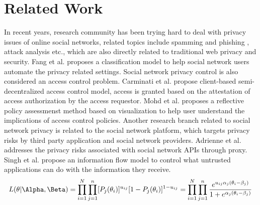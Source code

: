 \documentclass[a4paper]{article}
\begin{document}

\section{Related Work}

In recent years, research community has been trying hard to deal with
privacy issues of online social networks, related topics include
spamming and phishing \cite{twitter-spam, SN-explore-spam,
SN-automated-cheap-spam, social-spam-detection, video-spam-youtube},
attack analysis \cite{neighborhood-attack, 1658958,
group-deanonymization-attack, anony-link-attack,
identity-theft-attack, sybil-attack, 1608132} etc., which are also
directly related to traditional web privacy and security. Fang et
al. \cite{privacy-wizard} proposes a classification model to help
social network users automate the privacy related settings. Social
network privacy control is also considered an access control
problem. Carminati et al. \cite{crypto-collaborative-ac,
rule-based-ac} propose client-based semi-decentralized access control
model, access is granted based on the attestation of access
authorization by the access requestor. Mohd et
al. \cite{Anwar_visualizingprivacy} proposes a reflective policy
assessmenst method based on visualization to help user understand the
implications of access control policies. Another research branch
related to social network privacy is related to the social network
platform, which targets privacy risks by third party application and
social network providers. Adrienne et
al. \cite{Felt08privacyprotection} addresses the privacy risks
associated with social network APIs through proxy. Singh et
al. \cite{xbook-social-platform} propose an information flow model to
control what untrusted applications can do with the information they
receive.
\begin{equation}
  L(\theta|\Alpha,\Beta) = \prod_{i=1}^N\prod_{j=1}^n[P_j(\theta_i)]^{u_{ij}}[1-P_j(\theta_i)]^{1-u_{ij}}
  = \prod_{i=1}^N\prod_{j=1}^n\frac{e^{u_{ij}\alpha_j(\theta_i - \beta_j)}}{1 + e^{\alpha_j(\theta_i - \beta_j)}}
\end{equation}
\end{document}
